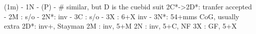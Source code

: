 (1m) - 1N - (P) - 
# similar, but D is the cuebid suit
2C*->2D*: tranfer accepted
        - 2M : s/o
        - 2N*: inv
        - 3C : s/o
        - 3X : 6+X inv
        - 3N*: 54+mms CoG, usually extra
2D*: inv+, Stayman
2M : inv, 5+M
2N : inv, 5+C, NF
3X : GF, 5+X